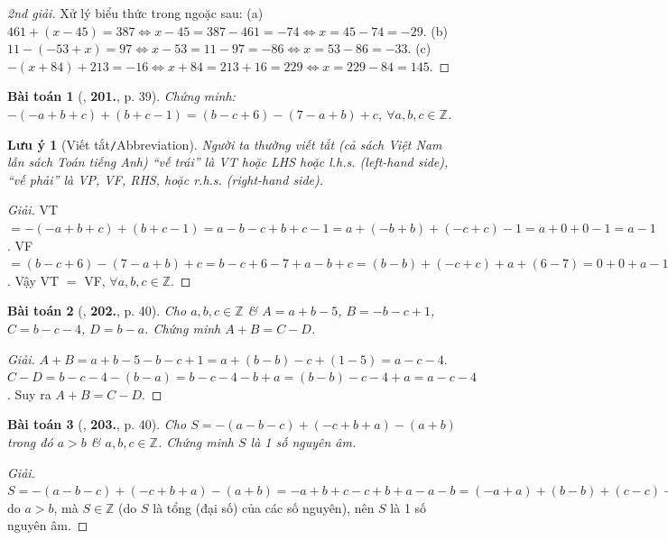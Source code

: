 \documentclass{article}
\numberwithin{equation}{section}
\newtheorem{baitoan}{Bài toán}
\newtheorem{luuy}{Lưu ý}[section]
\begin{document}
\begin{proof}[2nd giải]
	Xử lý biểu thức trong ngoặc sau: (a) $461 + (x - 45) = 387\Leftrightarrow x - 45 = 387 - 461 = -74\Leftrightarrow x = 45 - 74 = - 29$. (b) $11 - (-53 + x) = 97\Leftrightarrow x - 53 = 11 - 97 = -86\Leftrightarrow x = 53 - 86 = -33$. (c) $-(x + 84) + 213 = -16\Leftrightarrow x + 84 = 213 + 16 = 229\Leftrightarrow x = 229 - 84 = 145$.
\end{proof}

\begin{baitoan}[\cite{Tuyen_Toan_6}, \textbf{201.}, p. 39]
	Chứng minh: $-(-a + b + c) + (b + c - 1) = (b - c + 6) - (7 - a + b) + c$, $\forall a,b,c\in\mathbb{Z}$.
\end{baitoan}

\begin{luuy}[Viết tắt\texttt{/}Abbreviation]
	Người ta thường viết tắt (cả sách Việt Nam lẫn sách Toán tiếng Anh) ``vế trái'' là VT hoặc LHS hoặc l.h.s. (left-hand side), ``vế phải'' là VP, VF, RHS, hoặc r.h.s. (right-hand side).
\end{luuy}

\begin{proof}[Giải]
	VT $= -(-a + b + c) + (b + c - 1) = a - b - c + b + c - 1 = a + (-b + b) + (-c + c) - 1 = a + 0 + 0 - 1 = a - 1$. VF $= (b - c + 6) - (7 - a + b) + c = b - c + 6 - 7 + a - b + c = (b - b) + (-c + c) + a + (6 - 7) = 0 + 0 + a - 1 = a - 1$. Vậy VT $=$ VF, $\forall a,b,c\in\mathbb{Z}$.
\end{proof}

\begin{baitoan}[\cite{Tuyen_Toan_6}, \textbf{202.}, p. 40]
	Cho $a,b,c\in\mathbb{Z}$ \& $A = a + b - 5$, $B = -b - c + 1$, $C = b - c - 4$, $D = b - a$. Chứng minh $A + B = C - D$.
\end{baitoan}

\begin{proof}[Giải]
	$A + B = a + b - 5 - b - c + 1 = a + (b - b) - c + (1 - 5) = a - c - 4$. $C - D = b - c - 4 - (b - a) = b - c - 4 - b + a = (b - b) - c - 4 + a = a - c - 4$. Suy ra $A + B = C - D$.
\end{proof}

\begin{baitoan}[\cite{Tuyen_Toan_6}, \textbf{203.}, p. 40]
	Cho $S = -(a - b - c) + (-c + b + a) - (a + b)$ trong đó $a > b$ \& $a,b,c\in\mathbb{Z}$. Chứng minh $S$ là 1 số nguyên âm.
\end{baitoan}

\begin{proof}[Giải]
	$S = -(a - b - c) + (-c + b + a) - (a + b) = -a + b + c - c + b + a - a - b = (-a + a) + (b - b) + (c - c) + b - a = 0 + 0 + 0 + b - a = b - a < 0$ do $a > b$, mà $S\in\mathbb{Z}$ (do $S$ là tổng (đại số) của các số nguyên), nên $S$ là 1 số nguyên âm.
\end{proof}
\end{document}
